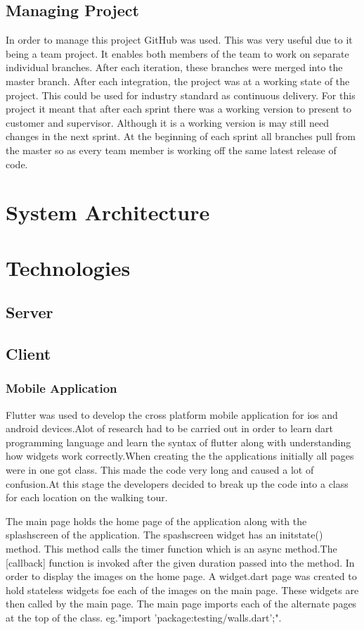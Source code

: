 \subsection{Managing Project}
In order to manage this project GitHub was used. This was very useful due to it being a team project. It enables both members of the team to work on separate individual branches. After each iteration, these branches were merged into the master branch. After each integration, the project was at a working state of the project. This could be used for industry standard as continuous delivery. For this project it meant that after each sprint there was a working version to present to customer and supervisor. Although it is a working version is may still need changes in the next sprint. At the beginning of each sprint all branches pull from the master so as every team member is working off the same latest release of code.
\section{System Architecture}
\section{Technologies}
\subsection{Server}
\subsection{Client}

\subsubsection{Mobile Application}
Flutter was used to develop the cross platform mobile application for ios and android devices.Alot of research had to be carried out in order to learn dart programming language and learn the syntax of flutter along with understanding how widgets work correctly.When creating the the applications initially all pages were in one got class. This made the code very long and caused a lot of confusion.At this stage the developers decided to break up the code into a class for each location on the walking tour.

The main page holds the home page of the application along with the splashscreen of the application. The spashscreen widget has an initstate() method. This method calls the timer function which is an async method.The [callback] function is invoked after the given duration passed into the method. In order to display the images on the home page. A widget.dart page was created to hold stateless widgets foe each of the images on the main page. These widgets are then called by the main page. The main page imports each of the alternate pages at the top of the class. eg."import 'package:testing/walls.dart';".

